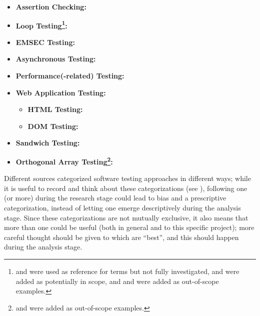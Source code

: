 \begin{itemize}
      \item \textbf{Assertion Checking:} \citet{LahiriEtAl2013, ChalinEtAl2006,
                  BerdineEtAl2006}
      \item \textbf{Loop Testing\footnote{\citep{ISO2015} and \citep{ISO2022}
                        were used as reference for terms but not fully
                        investigated, \citep{TrudnowskiEtAl2017} and
                        \citep{PierreEtAl2017} were added as potentially in
                        scope, and \citep{Goralski1999} and
                        \citep{Dominguez-PumarEtAl2020} were added as
                        out-of-scope examples.}:} \citet{DhokAndRamanathan2016,
                  GodefroidAndLuchaup2011, PreußeEtAl2012,
                  ForsythEtAl2004}
      \item \textbf{EMSEC Testing:} \citet{ZhouEtAl2012, ISO2021}
      \item \textbf{Asynchronous Testing:} \citet{JardEtAl1999}
      \item \textbf{Performance(-related) Testing:} \citet{Moghadam2019}
      \item \textbf{Web Application Testing:} \citet{DoğanEtAl2014, Kam2008}
            \begin{itemize}
                  \item \textbf{HTML Testing:} \citet{ChoudharyEtAl2010,
                              SneedAndGöschl2000, Gerrard2000b}
                  \item \textbf{DOM Testing:} \citet{BajammalAndMesbah2018}
            \end{itemize}
      \item \textbf{Sandwich Testing:} \citet{SharmaEtAl2021,
                  SangwanAndLaPlante2006}
      \item \textbf{Orthogonal Array Testing\footnote{
                        \citep{YuEtAl2011} and \citep{Tsui2007} were added as
                        out-of-scope examples.}:} \citet{Mandl1985, Valcheva2013}
\end{itemize}

Different sources categorized software testing approaches in different ways;
while it is useful to record and think about these categorizations (see
), following one (or more) during the research
stage could lead to bias and a prescriptive categorization, instead of letting
one emerge descriptively during the analysis stage. Since these categorizations
are not mutually exclusive, it also means that more than one could be useful
(both in general and to this specific project); more careful thought should be
given to which are ``best'', and this should happen during the analysis stage.

